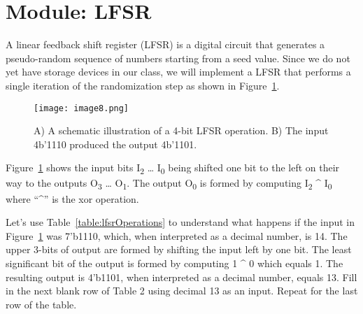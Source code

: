 \section{Module: LFSR}

A linear feedback shift register (LFSR) is a digital circuit that
generates a pseudo-random sequence of numbers starting from a seed
value. Since we do not yet have storage devices in our class, we will
implement a LFSR that performs a single iteration of the randomization
step as shown in Figure~\ref{fig:lfsrOperation}.

\begin{figure}[ht]
\texttt{[image: image8.png]}
\caption{A) A schematic illustration of a 4-bit LFSR operation. B) The
input 4b'1110 produced the output 4b'1101.}
\label{fig:lfsrOperation}
\end{figure}

Figure~\ref{fig:lfsrOperation} shows the input bits I\textsubscript{2} \ldots{}
I\textsubscript{0} being shifted one bit to the left on their way to the
outputs O\textsubscript{3} \ldots{} O\textsubscript{1}. The output
O\textsubscript{0} is formed by computing I\textsubscript{2} \^{}
I\textsubscript{0} where ``\^{}'' is the xor operation.

Let's use Table~\ref{table:lfsrOperations} to 
understand what happens if the input in 
Figure~\ref{fig:lfsrOperation}
was 7'b1110, which, when interpreted as a decimal number, is 14. The upper
3-bits of output are formed by shifting the input left by one bit. The
least significant bit of the output is formed by computing 1 \^{} 0
which equals 1. The resulting output is 4'b1101, when interpreted as a
decimal number, equals 13. Fill in the next blank row of Table 2 using
decimal 13 as an input. Repeat for the last row of the table.

